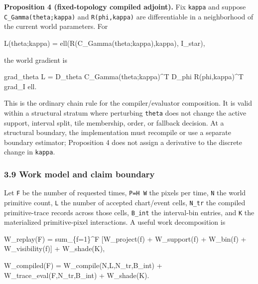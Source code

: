 \documentclass[
]{article}
\newenvironment{Shaded}{}{}
\newcommand{\NormalTok}[1]{#1}
\begin{document}
\textbf{Proposition 4 (fixed-topology compiled adjoint).} Fix
\texttt{kappa} and suppose \texttt{C\_Gamma(theta;kappa)} and
\texttt{R(phi,kappa)} are differentiable in a neighborhood of the
current world parameters. For

\begin{Shaded}
\begin{Highlighting}[]
\NormalTok{L(theta;kappa) = ell(R(C\_Gamma(theta;kappa),kappa), I\_star),}
\end{Highlighting}
\end{Shaded}

the world gradient is

\begin{Shaded}
\begin{Highlighting}[]
\NormalTok{grad\_theta L}
\NormalTok{  = D\_theta C\_Gamma(theta;kappa)\^{}T}
\NormalTok{    D\_phi R(phi,kappa)\^{}T}
\NormalTok{    grad\_I ell.}
\end{Highlighting}
\end{Shaded}

This is the ordinary chain rule for the compiler/evaluator composition.
It is valid within a structural stratum where perturbing \texttt{theta}
does not change the active support, interval split, tile membership,
order, or fallback decision. At a structural boundary, the
implementation must recompile or use a separate boundary estimator;
Proposition 4 does not assign a derivative to the discrete change in
\texttt{kappa}.

\subsubsection{3.9 Work model and claim
boundary}\label{work-model-and-claim-boundary}

Let \texttt{F} be the number of requested times, \texttt{P=H\ W} the
pixels per time, \texttt{N} the world primitive count, \texttt{L} the
number of accepted chart/event cells, \texttt{N\_tr} the compiled
primitive-trace records across those cells, \texttt{B\_int} the
interval-bin entries, and \texttt{K} the materialized primitive-pixel
interactions. A useful work decomposition is

\begin{Shaded}
\begin{Highlighting}[]
\NormalTok{W\_replay(F)}
\NormalTok{  = sum\_\{f=1\}\^{}F [W\_project(f) + W\_support(f)}
\NormalTok{                 + W\_bin(f) + W\_visibility(f)]}
\NormalTok{    + W\_shade(K),}

\NormalTok{W\_compiled(F)}
\NormalTok{  = W\_compile(N,L,N\_tr,B\_int)}
\NormalTok{    + W\_trace\_eval(F,N\_tr,B\_int)}
\NormalTok{    + W\_shade(K).}
\end{Highlighting}
\end{Shaded}
\end{document}
